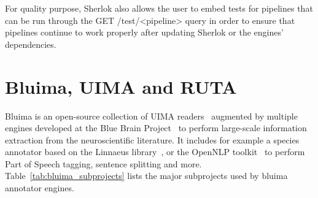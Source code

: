 \documentclass{article}
\newcommand{\REST}[1]{\textsf{#1}}
\begin{document}
For quality purpose, Sherlok also allows the user to embed tests for pipelines that can be run
through the \REST{GET /test/<pipeline>} query in order to ensure that pipelines continue to work
properly after updating Sherlok or the engines' dependencies.

\section{Bluima, UIMA and RUTA}
\label{sec:bluima}

Bluima is an open-source collection of UIMA readers~\cite{uima} augmented by multiple engines
developed at the Blue Brain Project~\cite{bbp} to perform large-scale information extraction from
the neuroscientific literature. It includes for example a species annotator based on the Linnaeus
library~\cite{linnaeus_2010}, or the OpenNLP toolkit~\cite{opennlp} to perform Part of Speech
tagging, sentence splitting and more. Table~\ref{tab:bluima_subprojects} lists the major subprojects
used by bluima annotator engines.
\end{document}
